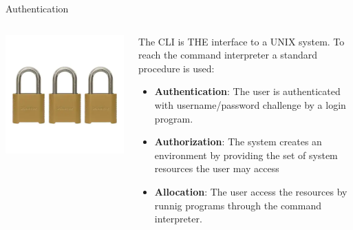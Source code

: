 \documentclass[unknownkeysallowed, 10pt, a4 paper, handout]{beamer}
\begin{document}
\begin{frame}[label=login]{Authentication}
  \begin{columns}[T]
    \begin{column}{.23\textwidth}
      \begin{center}
        \includegraphics[scale=0.25]{pics/locks.png}
      \end{center}
    \end{column}
    \hfill
    \begin{column}{.66\textwidth}
    \small{
      The CLI is THE interface to a UNIX system. To reach the command
      interpreter a standard procedure is used:
      \begin{itemize}
        \item \textbf{Authentication}: The user is authenticated with
          username/password challenge by a login program.
        \item \textbf{Authorization}: The system creates an environment
          by providing the set of system resources the user may access 
        \item \textbf{Allocation}: The user access the resources by
          runnig programs through the command interpreter.
      \end{itemize}
      }
    \end{column}
  \end{columns}
\end{frame}
\end{document}
